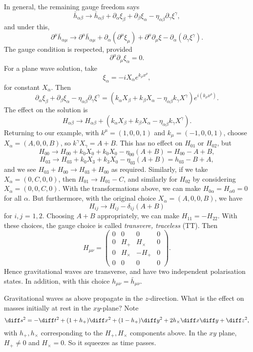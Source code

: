 \documentclass[12pt]{article}
\begin{document}
In general, the remaining gauge freedom says
\[
\bar h_{\alpha\beta} \to \bar h_{\alpha\beta} + \partial_\alpha \xi_\beta + \partial_\beta \xi_\alpha - \eta_{\alpha\beta} \partial_\gamma \xi^\gamma,
\]
and under this,
\[
	\partial^\mu \bar h_{\alpha\mu} \to \partial^\mu \bar h_{\alpha\mu} + \partial_\alpha (\partial^\mu \xi_\mu) + \partial^\mu \partial_\mu \xi - \partial_\alpha (\partial_\gamma \xi^\gamma).
\]
The gauge condition is respected, provided
\[
\partial^\mu \partial_\mu \xi_\alpha = 0.
\]
For a plane wave solution, take
\[
\xi_\alpha= -i X_\alpha e^{k_\rho x^\rho},
\]
for constant $X_\alpha$. Then
\[
\partial_\alpha \xi_\beta + \partial_\beta \xi_\alpha - \eta_{\alpha\beta} \partial_\gamma \xi^\gamma = (k_\alpha X_\beta + k_\beta X_\alpha - \eta_{\alpha\beta} k_\gamma X^\gamma) e^{i(k_\rho x^\rho)}.
\]
The effect on the solution is
\[
H_{\alpha\beta} \to H_{\alpha\beta} + (k_\alpha X_\beta + k_\beta X_\alpha - \eta_{\alpha\beta} k_\gamma X^\gamma).
\]
Returning to our example, with $k^\mu = (1, 0, 0, 1)$ and $k_\mu = (-1, 0, 0, 1)$, choose $X_\alpha = (A, 0, 0, B)$, so $k^\gamma X_\gamma = A + B$. This has no effect on $H_{01}$ or $H_{02}$, but
\[
H_{00} \to H_{00} + k_0 X_0 + k_0 X_0 - \eta_{00}(A + B) = H_{00}-  A + B,
\]
\[
H_{03} \to H_{03} + k_{0} X_3 + k_3 X_0 - \eta_{03} (A + B) = h_{03} - B + A,
\]
and we see $H_{03} + H_{00} \to H_{03} + H_{00}$ as required. Similarly, if we take $X_\alpha = (0, C, 0, 0)$, then $H_{01} \to H_{01} - C$, and similarly for $H_{02}$ by considering $X_\alpha = (0, 0, C, 0)$. With the transformations above, we can make $H_{0\alpha} = H_{\alpha0} = 0$ for all $\alpha$. But furthermore, with the original choice $X_\alpha = (A, 0, 0, B)$, we have
\[
H_{ij} \to H_{ij} - \delta_{ij} (A + B)
\]
for $i, j$ = $1, 2$. Choosing $A + B$ appropriately, we can make $H_{11} = - H_{22}$. With these choices, the gauge choice is called \emph{transvere, traceless} (TT). Then
\[
H_{\mu\nu} =
\begin{pmatrix}
	0 & 0 & 0 & 0 \\
	0 & H_+ & H_\times & 0 \\
	0 & H_\times & -H_+ & 0 \\
	0 & 0 & 0 & 0
\end{pmatrix}.
\]
Hence gravitational waves are transverse, and have two independent polarisation states. In addition, with this choice $h_{\mu\nu} = \bar h_{\mu\nu}$.

Gravitational waves as above propagate in the $z$-direction. What is the effect on masses initially at rest in the $xy$-plane? Note
\[
\diff s^2 = - \diff t^2 + (1 + h_+) \diff x^2 + (1 - h_+) \diff y^2 + 2 h_\times \diff x \diff y + \diff z^2,
\]
with $h_+, h_\times$ corresponding to the $H_+, H_\times$ components above. In the $xy$ plane, $H_+ \neq 0$ and $H_\times = 0$. So it squeezes as time passes.
\end{document}
